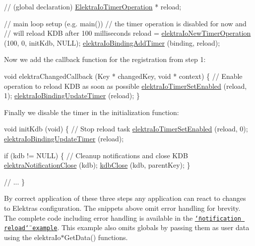 \begin{DoxyCode}
\textcolor{comment}{// (global declaration)}
\hyperlink{kdbio_8h_a09c40c890207a8244fc39bb930fee1fa}{ElektraIoTimerOperation} * reload;

\textcolor{comment}{// main loop setup (e.g. main())}
\textcolor{comment}{// the timer operation is disabled for now and}
\textcolor{comment}{// will reload KDB after 100 milliseconds}
reload = \hyperlink{io_8c_a67a0a81d263e0a7853809144c4ea5198}{elektraIoNewTimerOperation} (100, 0, initKdb, NULL);
\hyperlink{io_8c_a1d61dca5ec35900c33224d82711c0bdb}{elektraIoBindingAddTimer} (binding, reload);
\end{DoxyCode}


Now we add the callback function for the registration from step 1\+:


\begin{DoxyCode}
\textcolor{keywordtype}{void} elektraChangedCallback (Key * changedKey, \textcolor{keywordtype}{void} * context)
\{
        \textcolor{comment}{// Enable operation to reload KDB as soon as possible}
        \hyperlink{io_8c_a301cebc4da212bdb3aac0ad84f70ad85}{elektraIoTimerSetEnabled} (reload, 1);
        \hyperlink{io_8c_add5679a2ff842d88435938d629497e27}{elektraIoBindingUpdateTimer} (reload);
\}
\end{DoxyCode}


Finally we disable the timer in the initialization function\+:


\begin{DoxyCode}
\textcolor{keywordtype}{void} initKdb (\textcolor{keywordtype}{void})
\{
        \textcolor{comment}{// Stop reload task}
        \hyperlink{io_8c_a301cebc4da212bdb3aac0ad84f70ad85}{elektraIoTimerSetEnabled} (reload, 0);
        \hyperlink{io_8c_add5679a2ff842d88435938d629497e27}{elektraIoBindingUpdateTimer} (reload);

        \textcolor{keywordflow}{if} (kdb != NULL)
        \{
                \textcolor{comment}{// Cleanup notifications and close KDB}
                \hyperlink{group__kdbnotification_ga5685dafbd4131011365628d6d9213594}{elektraNotificationClose} (kdb);
                \hyperlink{group__kdb_gadb54dc9fda17ee07deb9444df745c96f}{kdbClose} (kdb, parentKey);
        \}

        \textcolor{comment}{// ...}
\}
\end{DoxyCode}


By correct application of these three steps any application can react to changes to Elektra\textquotesingle{}s configuration. The snippets above omit error handling for brevity. The complete code including error handling is available in the \href{https://www.libelektra.org/examples/notificationreload}{\tt \char`\"{}notification reload\char`\"{} example}. This example also omits globals by passing them as user data using the {\ttfamily elektra\+Io$\ast$\+Get\+Data()} functions.

